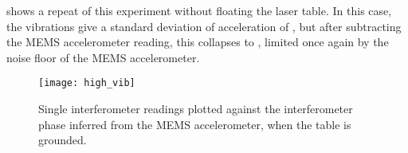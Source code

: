 \par\noindent
{} shows a repeat of this experiment without
floating the laser table. In this case, the vibrations give a standard
deviation of acceleration of
, but after subtracting the
MEMS accelerometer reading, this collapses to
, limited once again by
the noise floor of the MEMS accelerometer. 
\begin{figure}[htpb!]
  \centering
  \texttt{[image: high\_vib]}
  \caption[MEMS accelerometer and transition probability in high
  vibration noise]{Single interferometer readings plotted against the
  interferometer phase inferred from the MEMS accelerometer, when the
table is grounded.}
\label{fig:high_vib}
\end{figure}


